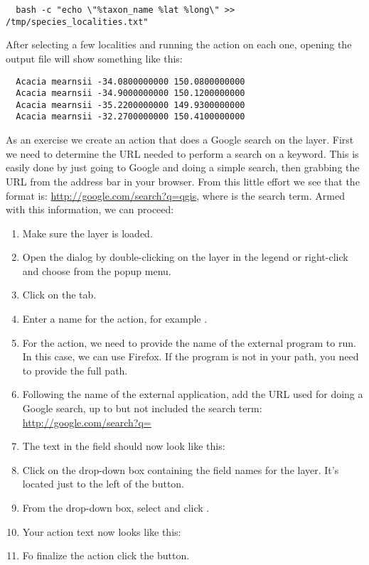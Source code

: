 \begin{verbatim}
  bash -c "echo \"%taxon_name %lat %long\" >> /tmp/species_localities.txt"
\end{verbatim} 

After selecting a few localities and running the action on each one, opening
the output file will show something like this:

\begin{verbatim}
  Acacia mearnsii -34.0800000000 150.0800000000
  Acacia mearnsii -34.9000000000 150.1200000000
  Acacia mearnsii -35.2200000000 149.9300000000
  Acacia mearnsii -32.2700000000 150.4100000000
\end{verbatim} 

As an exercise we create an action that does a Google search on the 
 layer. First we need to determine the URL needed to perform a search on a
keyword. This is easily done by just going to Google and doing a simple
search, then grabbing the URL from the address bar in your browser. From this
little effort we see that the format is: \url{http://google.com/search?q=qgis},
where  is the search term. Armed with this information, we can
proceed:

\begin{enumerate}
\item Make sure the  layer is loaded.
\item Open the  dialog by double-clicking on the layer in the
  legend or right-click and choose  from the popup menu.
\item Click on the  tab.
\item Enter a name for the action, for example .
\item For the action, we need to provide the name of the external program to
  run. In this case, we can use Firefox. If the program is not in
  your path, you need to provide the full path.
\item Following the name of the external application, add the URL used for
  doing a Google search, up to but not included the search term:
  \url{http://google.com/search?q=}
\item The text in the  field should now look like this:\\
\item Click on the drop-down box containing the field names for the
   layer. It's located just to the left of the
   button.
\item From the drop-down box, select  and click .
\item Your action text now looks like this:\\ 
\item Fo finalize the action click the  button.
\end{enumerate}
 
